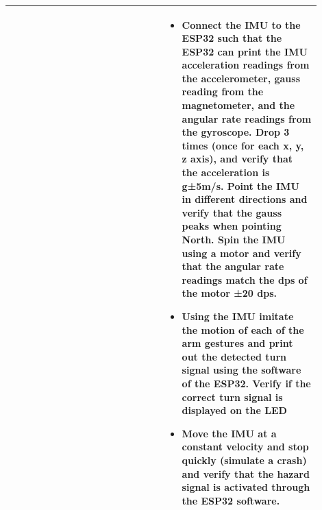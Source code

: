 \begin{table}[ht]
\begin{tabular}{p{0.45\linewidth}p{0.45\linewidth}}
\begin{itemize}[leftmargin=*, nosep, after=\strut]
\begin{itemize}[nosep]
        \end{itemize}
    \end{itemize} &
    \begin{itemize}[leftmargin=*, nosep, after=\strut]
        \item Connect the IMU to the ESP32 such that the ESP32 can print the IMU acceleration readings from the accelerometer, gauss reading from the magnetometer, and the angular rate readings from the gyroscope. Drop 3 times (once for each x, y, z axis), and verify that the acceleration is g±5m/s. Point the IMU in different directions and verify that the gauss peaks when pointing North. Spin the IMU using a motor and verify that the angular rate readings match the dps of the motor ±20 dps.
        \item Using the IMU imitate the motion of each of the arm gestures and print out the detected turn signal using the software of the ESP32. Verify if the correct turn signal is displayed on the LED
        \item Move the IMU at a constant velocity and stop quickly (simulate a crash) and verify that the hazard signal is activated through the ESP32 software.
    \end{itemize} \\
    \bottomrule
    \end{tabular}
    \end{table}
    \newpage
